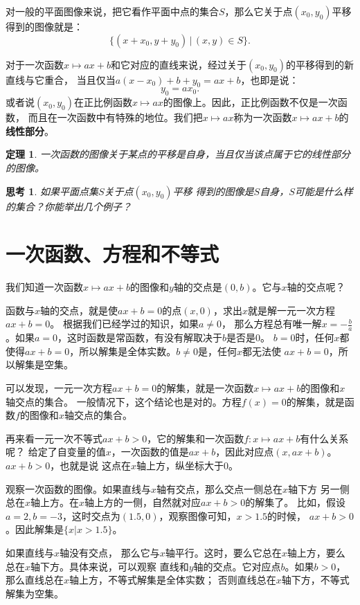 \documentclass[12pt,UTF8]{ctexbook}
\newtheorem{tm}{定理}[section]
\newtheorem{sk}{思考}[section]
\begin{document}
对一般的平面图像来说，把它看作平面中点的集合$S$，那么它关于点$(x_0, y_0)$平移
得到的图像就是：
$$\{(x+x_0, y+y_0) \,|\, (x,y)\in S \}.$$

对于一次函数$x\mapsto ax+b$和它对应的直线来说，经过关于$(x_0, y_0)$的平移得到的新直线与它重合，
当且仅当$a(x-x_0)+b+y_0 = ax + b$，也即是说：
$$ y_0 = ax_0.$$
或者说$(x_0, y_0)$在正比例函数$x\mapsto ax$的图像上。因此，正比例函数不仅是一次函数，
而且在一次函数中有特殊的地位。我们把$x\mapsto ax$称为一次函数$x\mapsto ax+b$的\textbf{线性部分}。

\begin{tm}\label{tm:5-2-0}
    一次函数的图像关于某点的平移是自身，当且仅当该点属于它的线性部分的图像。
\end{tm}

\begin{sk}\label{sk:5-2-0}
    如果平面点集$S$关于点$(x_0, y_0)$平移
    得到的图像是$S$自身，$S$可能是什么样的集合？你能举出几个例子？
\end{sk}

\section{一次函数、方程和不等式}
我们知道一次函数$x\mapsto ax + b$的图像和$y$轴的交点是$(0, b)$。它与$x$轴的交点呢？

函数与$x$轴的交点，就是使$ax + b = 0$的点$(x, 0)$，求出$x$就是解一元一次方程$ax + b = 0$。
根据我们已经学过的知识，如果$a\neq 0$，
那么方程总有唯一解$x= -\frac{b}{a}$。如果$a = 0$，这时函数是常函数，有没有解取决于$b$是否是$0$。
$b = 0$时，任何$x$都使得$ax + b = 0$，所以解集是全体实数。$b \neq 0$是，任何$x$都无法使
$ax + b = 0$，所以解集是空集。

可以发现，一元一次方程$ax + b = 0$的解集，就是一次函数$x\mapsto ax + b$的图像和$x$轴交点的集合。
一般情况下，这个结论也是对的。方程$f(x) = 0$的解集，就是函数$f$的图像和$x$轴交点的集合。

再来看一元一次不等式$ax + b > 0$，它的解集和一次函数$f:x\mapsto ax + b$有什么关系呢？
给定了自变量的值$x$，一次函数的值是$ax + b$，因此对应点$(x, ax + b)$。$ax + b > 0$，也就是说
这点在$x$轴上方，纵坐标大于$0$。

观察一次函数的图像。如果直线与$x$轴有交点，那么交点一侧总在$x$轴下方
另一侧总在$x$轴上方。在$x$轴上方的一侧，自然就对应$ax + b > 0$的解集了。
比如，假设$a = 2, b = -3$，这时交点为$(1.5, 0)$，观察图像可知，$x > 1.5$的时候，
$ax + b > 0$。因此解集是$\{x | x > 1.5\}$。

如果直线与$x$轴没有交点，
那么它与$x$轴平行。这时，要么它总在$x$轴上方，要么总在$x$轴下方。具体来说，可以观察
直线和$y$轴的交点。它对应点$b$。如果$b>0$，那么直线总在$x$轴上方，不等式解集是全体实数；
否则直线总在$x$轴下方，不等式解集为空集。
\end{document}
